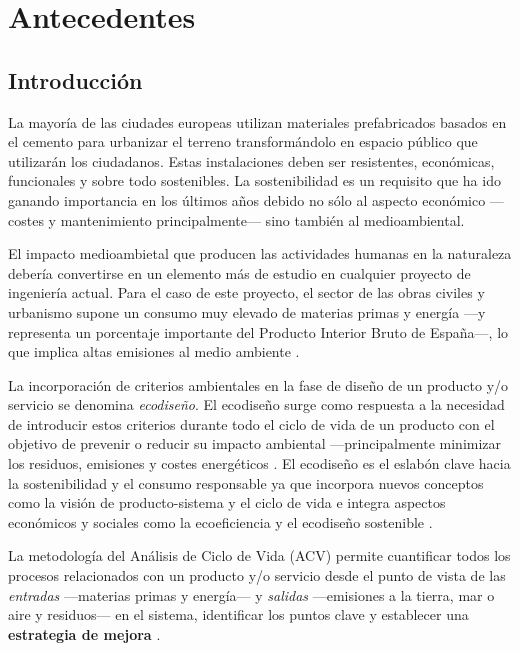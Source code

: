 \chapter{Antecedentes}\label{cap:antecedentes}

\section{Introducción}\label{sec:introantecedentes}
La mayoría de las ciudades europeas utilizan materiales prefabricados basados en el cemento para urbanizar el terreno transformándolo en espacio público que utilizarán los ciudadanos. Estas instalaciones deben ser resistentes, económicas, funcionales y sobre todo sostenibles. La sostenibilidad es un requisito que ha ido ganando importancia en los últimos años debido no sólo al aspecto económico —costes y mantenimiento principalmente— sino también al medioambiental.

El impacto medioambietal que producen las actividades humanas en la naturaleza debería convertirse en un elemento más de estudio en cualquier proyecto de ingeniería actual. Para el caso de este proyecto, el sector de las obras civiles y urbanismo supone un consumo muy elevado de materias primas y energía —y representa un porcentaje importante del Producto Interior Bruto de España—, lo que implica altas emisiones al medio ambiente \cite{minetur}.

La incorporación de criterios ambientales en la fase de diseño de un producto y/o servicio se denomina \textit{ecodiseño}. El ecodiseño surge como respuesta a la necesidad de introducir estos criterios durante todo el ciclo de vida de un producto con el objetivo de prevenir o reducir su impacto ambiental —principalmente minimizar los residuos, emisiones y costes energéticos \cite{iso14006}. El ecodiseño es el eslabón clave hacia la sostenibilidad y el consumo responsable ya que incorpora nuevos conceptos como la visión de producto-sistema y el ciclo de vida e integra aspectos económicos y sociales como la ecoeficiencia y el ecodiseño sostenible \cite{ihobeeco}.

La metodología del Análisis de Ciclo de Vida (ACV) permite cuantificar todos los procesos relacionados con un producto y/o servicio desde el punto de vista de las \textit{entradas} —materias primas y energía— y \textit{salidas} —emisiones a la tierra, mar o aire y residuos— en el sistema, identificar los puntos clave y establecer una \textbf{estrategia de mejora} \cite{iso14040}.


